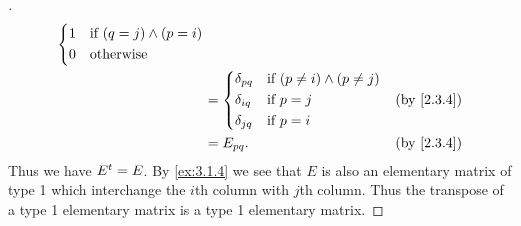 \begin{proof}[]
\begin{align*}
\begin{dcases}
			                                                          1 & \text{if } (q = j) \land (p = i)                     \\
			                                                          0 & \text{otherwise}
		                                                          \end{dcases}                  \\
		                                                      & = \begin{dcases}
			                                                          \delta_{p q} & \text{if } (p \neq i) \land (p \neq j) \\
			                                                          \delta_{i q} & \text{if } p = j                       \\
			                                                          \delta_{j q} & \text{if } p = i
		                                                          \end{dcases}    &  & \by{2.3.4}                     \\
		                                                      & = E_{p q}.                                                  &  & \by{2.3.4}
	\end{align*}
	Thus we have \({E}^{t} = E\).
	By \cref{ex:3.1.4} we see that \(E\) is also an elementary matrix of type 1 which interchange the \(i\)th column with \(j\)th column.
	Thus the transpose of a type 1 elementary matrix is a type 1 elementary matrix.


\end{proof}
